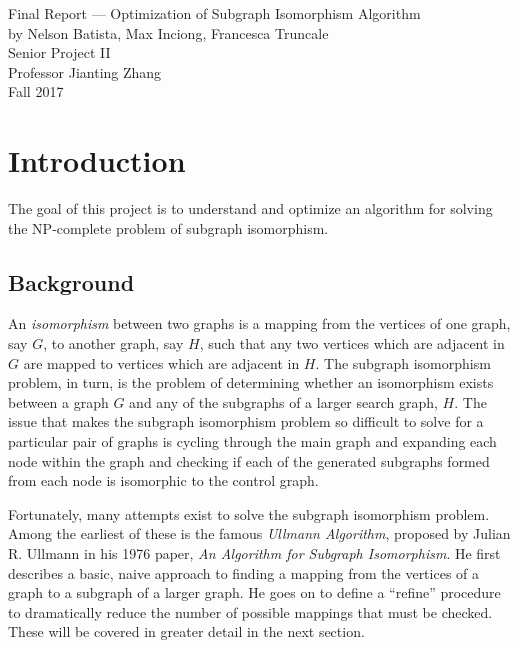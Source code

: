 \documentclass{article}
\begin{document}
\thispagestyle{empty}

\begin{titlepage}
  \vspace*{\fill} %
  \begin{center}
    {\Huge Final Report --- Optimization of Subgraph Isomorphism Algorithm}\\[0.4cm]
    {\huge by Nelson Batista, Max Inciong, Francesca Truncale}\\[0.5cm]
    {\huge Senior Project II}\\[0.4cm]
    {\huge Professor Jianting Zhang}\\[0.4cm]
    {\LARGE Fall 2017}
  \end{center}
  \vspace*{\fill}
\end{titlepage}

\tableofcontents

\newpage

\setcounter{page}{1}

\section{Introduction}

The goal of this project is to understand and optimize an algorithm for solving the NP-complete problem of subgraph isomorphism.

  \subsection{Background}

  An \textit{isomorphism} between two graphs is a mapping from the vertices of one graph, say $G$, to another graph, say $H$, such that any two vertices which are adjacent in $G$ are mapped to vertices which are adjacent in $H$. The subgraph isomorphism problem, in turn, is the problem of determining whether an isomorphism exists between a graph $G$ and any of the subgraphs of a larger search graph, $H$. The issue that makes the subgraph isomorphism problem so difficult to solve for a particular pair of graphs is cycling through the main graph and expanding each node within the graph and checking if each of the generated subgraphs formed from each node is isomorphic to the control graph.

  Fortunately, many attempts exist to solve the subgraph isomorphism problem. Among the earliest of these is the famous \textit{Ullmann Algorithm}, proposed by Julian R. Ullmann in his 1976 paper, \textit{An Algorithm for Subgraph Isomorphism}. He first describes a basic, naive approach to finding a mapping from the vertices of a graph to a subgraph of a larger graph. He goes on to define a ``refine'' procedure to dramatically reduce the number of possible mappings that must be checked.\cite{ullmann} These will be covered in greater detail in the next section.
\end{document}
